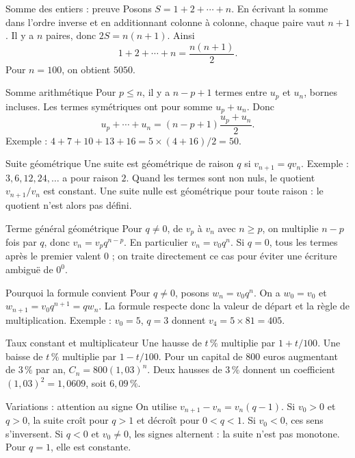 \documentclass[aspectratio=169,12pt]{beamer}
\begin{document}
\renewcommand{\slidekind}{JUSTIFIER}
\begin{frame}[t,fragile]{Somme des entiers : preuve}
Posons $S=1+2+\cdots+n$. En écrivant la somme dans l’ordre inverse et en additionnant colonne à colonne, chaque paire vaut $n+1$. Il y a $n$ paires, donc $2S=n(n+1)$. Ainsi \[1+2+\cdots+n=\frac{n(n+1)}2.\] Pour $n=100$, on obtient $5050$.
\end{frame}
\renewcommand{\slidekind}{COMPRENDRE}
\begin{frame}[t,fragile]{Somme arithmétique}
Pour $p\le n$, il y a $n-p+1$ termes entre $u_p$ et $u_n$, bornes incluses. Les termes symétriques ont pour somme $u_p+u_n$. Donc \[u_p+\cdots+u_n=(n-p+1)\frac{u_p+u_n}{2}.\] Exemple : $4+7+10+13+16=5\times(4+16)/2=50$.
\end{frame}
\renewcommand{\slidekind}{COMPRENDRE}
\begin{frame}[t,fragile]{Suite géométrique}
Une suite est géométrique de raison $q$ si $v_{n+1}=qv_n$. Exemple : $3,6,12,24,\ldots$ a pour raison $2$. Quand les termes sont non nuls, le quotient $v_{n+1}/v_n$ est constant. Une suite nulle est géométrique pour toute raison : le quotient n’est alors pas défini.
\end{frame}
\renewcommand{\slidekind}{COMPRENDRE}
\begin{frame}[t,fragile]{Terme général géométrique}
Pour $q\ne0$, de $v_p$ à $v_n$ avec $n\ge p$, on multiplie $n-p$ fois par $q$, donc $v_n=v_pq^{n-p}$. En particulier $v_n=v_0q^n$. Si $q=0$, tous les termes après le premier valent $0$ ; on traite directement ce cas pour éviter une écriture ambiguë de $0^0$.
\end{frame}
\renewcommand{\slidekind}{JUSTIFIER}
\begin{frame}[t,fragile]{Pourquoi la formule convient}
Pour $q\ne0$, posons $w_n=v_0q^n$. On a $w_0=v_0$ et $w_{n+1}=v_0q^{n+1}=qw_n$. La formule respecte donc la valeur de départ et la règle de multiplication. Exemple : $v_0=5$, $q=3$ donnent $v_4=5\times81=405$.
\end{frame}
\renewcommand{\slidekind}{COMPRENDRE}
\begin{frame}[t,fragile]{Taux constant et multiplicateur}
Une hausse de $t\,\%$ multiplie par $1+t/100$. Une baisse de $t\,\%$ multiplie par $1-t/100$. Pour un capital de $800$ euros augmentant de $3\,\%$ par an, $C_n=800(1,03)^n$. Deux hausses de $3\,\%$ donnent un coefficient $(1,03)^2=1,0609$, soit $6,09\,\%$.
\end{frame}
\renewcommand{\slidekind}{COMPRENDRE}
\begin{frame}[t,fragile]{Variations : attention au signe}
On utilise $v_{n+1}-v_n=v_n(q-1)$. Si $v_0>0$ et $q>0$, la suite croît pour $q>1$ et décroît pour $0<q<1$. Si $v_0<0$, ces sens s’inversent. Si $q<0$ et $v_0\ne0$, les signes alternent : la suite n’est pas monotone. Pour $q=1$, elle est constante.
\end{frame}
\end{document}

